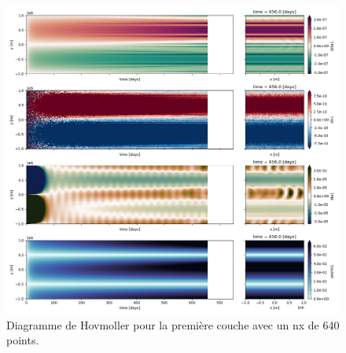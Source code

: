 \documentclass[10pt]{article}
\numberwithin{equation}{section}
\begin{document}
\begin{figure}[!htpb]
\centering
\includegraphics[width=.9\linewidth]{figures/tests/2023-06-28_hovmoller1_nx640_t=750days.png}
\caption{\label{fig:org670109d}Diagramme de Hovmoller pour la première couche avec un nx de 640 points.}
\end{figure}
\end{document}
